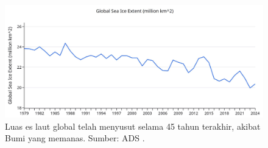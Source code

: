 \documentclass[10pt,twocolumn,letterpaper]{article}
\renewcommand{\refname}{Referensi}
\begin{document}
\begin{figure}[t]
\begin{center}
\includegraphics[width=1\textwidth]{ice.jpg}
\end{center}

   \caption{Luas es laut global telah menyusut selama 45 tahun terakhir, akibat Bumi yang memanas. Sumber: ADS \cite{149}.}
\label{fig:24}
\end{figure}

\clearpage
\twocolumn

{\small
\renewcommand{\refname}{Referensi}


}
\end{document}
